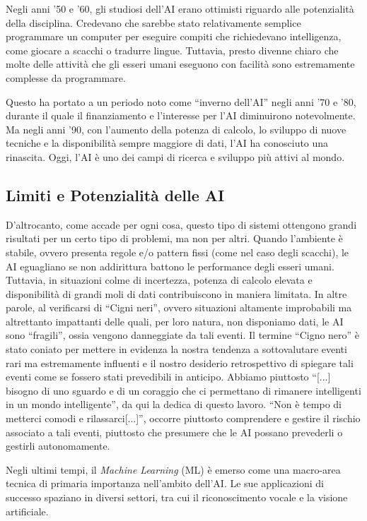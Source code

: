 \documentclass[12pt,a4paper,twoside,openright]{book}
\begin{document}
Negli anni '50 e '60, gli studiosi dell'AI erano ottimisti riguardo alle potenzialità della disciplina. Credevano che sarebbe stato relativamente semplice programmare un computer per eseguire compiti che richiedevano intelligenza, come giocare a scacchi o tradurre lingue. Tuttavia, presto divenne chiaro che molte delle attività che gli esseri umani eseguono con facilità sono estremamente complesse da programmare.

Questo ha portato a un periodo noto come ``inverno dell'AI'' negli anni '70 e '80, durante il quale il finanziamento e l'interesse per l'AI diminuirono notevolmente. Ma negli anni '90, con l'aumento della potenza di calcolo, lo sviluppo di nuove tecniche e la disponibilità sempre maggiore di dati, l'AI ha conosciuto una rinascita. Oggi, l'AI è uno dei campi di ricerca e sviluppo più attivi al mondo.


\subsection{Limiti e Potenzialità delle AI}
D'altrocanto, come accade per ogni cosa, questo tipo di sistemi ottengono grandi risultati per un certo tipo di problemi, ma non per altri. Quando l'ambiente è stabile, ovvero presenta regole e/o pattern fissi (come nel caso degli scacchi), le AI eguagliano se non addirittura battono le performance degli esseri umani. Tuttavia, in situazioni colme di incertezza, potenza di calcolo elevata e disponibilità di grandi moli di dati contribuiscono in maniera limitata. In altre parole, al verificarsi di ``Cigni neri''\cite{books/taleb/cigno}, ovvero situazioni altamente improbabili ma altrettanto impattanti delle quali, per loro natura, non disponiamo dati, le AI sono ``fragili'', ossia vengono danneggiate da tali eventi.
Il termine ``Cigno nero'' è stato coniato per mettere in evidenza la nostra tendenza a sottovalutare eventi rari ma estremamente influenti e il nostro desiderio retrospettivo di spiegare tali eventi come se fossero stati prevedibili in anticipo. Abbiamo piuttosto ``[...] bisogno di uno sguardo e di un coraggio che ci permettano di rimanere intelligenti in un mondo intelligente''\cite{books/gigerenzer/intelligenza}, da qui la dedica di questo lavoro. 
``Non è tempo di metterci comodi e rilassarci[...]''\cite{books/gigerenzer/intelligenza}, occorre piuttosto comprendere e gestire il rischio associato a tali eventi, piuttosto che presumere che le AI possano prevederli o gestirli autonomamente.

Negli ultimi tempi, il \emph{Machine Learning} (ML) è emerso come una macro-area tecnica di primaria importanza nell'ambito dell'AI. Le sue applicazioni di successo spaziano in diversi settori, tra cui il riconoscimento vocale e la visione artificiale.
\end{document}
